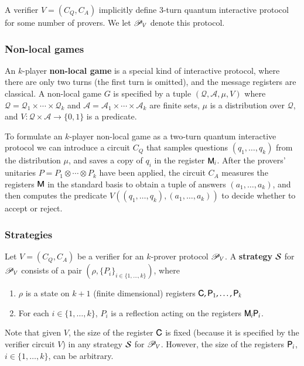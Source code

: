 A verifier $V = (C_Q,C_A)$ implicitly define $3$-turn quantum interactive protocol for some number of provers. We let $\mathscr{P}_V$ denote this protocol.



\subsubsection{Non-local games} 


An $k$-player \textbf{non-local game} is a special kind of interactive protocol, where there are only two turns (the first turn is omitted), and the message registers are classical. A non-local game $G$ is specified by a tuple $(\mathcal{Q},\mathcal{A},\mu,V)$ where $\mathcal{Q} = \mathcal{Q}_1 \times \cdots \times \mathcal{Q}_k$ and $\mathcal{A} = \mathcal{A}_1 \times \cdots \times \mathcal{A}_k$ are finite sets, $\mu$ is a distribution over $\mathcal{Q}$, and $V: \mathcal{Q} \times \mathcal{A} \to \{0,1\}$ is a predicate. 


To formulate an $k$-player non-local game as a two-turn quantum interactive protocol we can introduce a circuit $C_Q$ that samples questions $(q_1,\ldots,q_k)$ from the distribution $\mu$, and saves a copy of $q_i$ in the register ${\mathsf{M}}_i$. After the provers' unitaries $P = P_1 \otimes \cdots \otimes P_k$ have been applied, the circuit $C_A$ measures the registers ${\mathsf{M}}$  in the standard basis to obtain a tuple of answers $(a_1,\ldots,a_k)$, and then computes the predicate $V((q_1,\ldots,q_k),(a_1,\ldots,a_k))$ to decide whether to accept or reject.


\subsubsection{Strategies}

Let $V = (C_Q,C_A)$ be a verifier for an $k$-prover protocol $\mathscr{P}_V$. A \textbf{strategy} $\mathcal{S}$ for $\mathscr{P}_V$ consists of a pair $(\rho,\{P_i\}_{i\in\{1,\ldots,k\}})$, where
\begin{enumerate}
	\item $\rho$ is a state on $k+1$ (finite dimensional) registers ${\mathsf{C}}, {\mathsf{P}}_1, \ldots, {\mathsf{P}}_k$
	\item For each $i\in\{1,\ldots,k\}$, $P_i$ is a reflection acting on the registers ${\mathsf{M}}_i {\mathsf{P}}_i$.
\end{enumerate}
Note that given $V$, the size of the register ${\mathsf{C}}$ is fixed (because it is specified by the verifier circuit $V$) in any strategy $\mathcal{S}$ for $\mathscr{P}_V$. However, the size of the registers ${\mathsf{P}}_i$, $i\in\{1,\ldots,k\}$, can be arbitrary.

